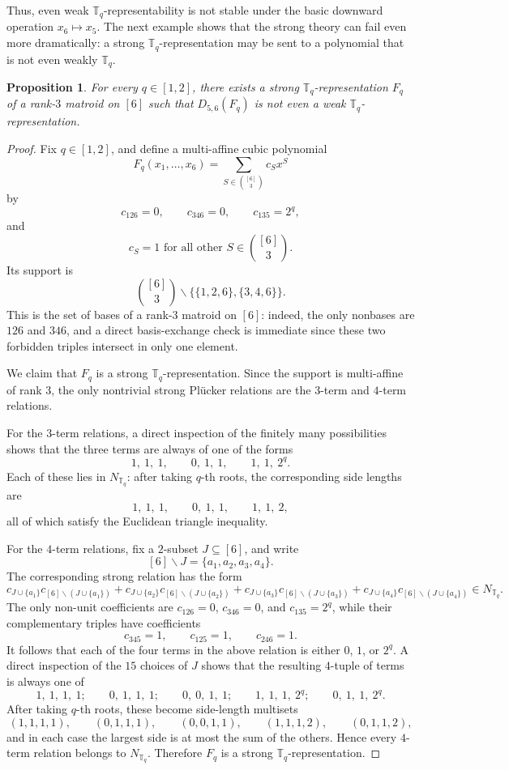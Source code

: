 \documentclass[12pt]{amsart}
\newtheorem{proposition}[theorem]{Proposition}
\theoremstyle{definition}
\newcommand{\1}{\mathbf{1}}
\newcommand\T{{\mathbb T}}
\renewcommand{\setminus}{\backslash}
\begin{document}
Thus, even weak $\T_q$-representability is not stable under the basic downward operation
$x_6\mapsto x_5$. The next example shows that the strong theory can fail even more
dramatically: a strong $\T_q$-representation may be sent to a polynomial that is not even
weakly $\T_q$.

\begin{proposition}
\label{prop:down-not-strong}
For every $q\in[1,2]$, there exists a strong $\T_q$-representation $F_q$ of a
rank-$3$ matroid on $[6]$ such that $D_{5,6}(F_q)$ is not even a weak
$\T_q$-representation.
\end{proposition}

\begin{proof}
Fix $q\in[1,2]$, and define a multi-affine cubic polynomial
\[
F_q(x_1,\dots,x_6)=\sum_{S\in \binom{[6]}{3}} c_S x^S
\]
by
\[
c_{126}=0,\qquad c_{346}=0,\qquad c_{135}=2^q,
\]
and
\[
c_S=1 \text{ for all other } S\in \binom{[6]}{3}.
\]
Its support is
\[
\binom{[6]}{3}\setminus\{\{1,2,6\},\{3,4,6\}\}.
\]
This is the set of bases of a rank-$3$ matroid on $[6]$: indeed, the only nonbases are
$126$ and $346$, and a direct basis-exchange check is immediate since these two forbidden
triples intersect in only one element.

We claim that $F_q$ is a strong $\T_q$-representation. Since the support is multi-affine of
rank $3$, the only nontrivial strong Pl\"ucker relations are the $3$-term and $4$-term
relations.

For the $3$-term relations, a direct inspection of the finitely many possibilities shows that
the three terms are always of one of the forms
\[
1,\ 1,\ 1,
\qquad
0,\ 1,\ 1,
\qquad
1,\ 1,\ 2^q.
\]
Each of these lies in $N_{\T_q}$: after taking $q$-th roots, the corresponding side lengths
are
\[
1,\ 1,\ 1,
\qquad
0,\ 1,\ 1,
\qquad
1,\ 1,\ 2,
\]
all of which satisfy the Euclidean triangle inequality.

For the $4$-term relations, fix a $2$-subset $J\subseteq [6]$, and write
\[
[6]\setminus J=\{a_1,a_2,a_3,a_4\}.
\]
The corresponding strong relation has the form
\[
c_{J\cup\{a_1\}}c_{[6]\setminus(J\cup\{a_1\})}
+
c_{J\cup\{a_2\}}c_{[6]\setminus(J\cup\{a_2\})}
+
c_{J\cup\{a_3\}}c_{[6]\setminus(J\cup\{a_3\})}
+
c_{J\cup\{a_4\}}c_{[6]\setminus(J\cup\{a_4\})}\in N_{\T_q}.
\]
The only non-unit coefficients are $c_{126}=0$, $c_{346}=0$, and $c_{135}=2^q$, while
their complementary triples have coefficients
\[
c_{345}=1,\qquad c_{125}=1,\qquad c_{246}=1.
\]
It follows that each of the four terms in the above relation is either $0$, $1$, or
$2^q$. A direct inspection of the $15$ choices of $J$ shows that the resulting $4$-tuple
of terms is always one of
\[
1,\ 1,\ 1,\ 1;
\qquad
0,\ 1,\ 1,\ 1;
\qquad
0,\ 0,\ 1,\ 1;
\qquad
1,\ 1,\ 1,\ 2^q;
\qquad
0,\ 1,\ 1,\ 2^q.
\]
After taking $q$-th roots, these become side-length multisets
\[
(1,1,1,1),\qquad (0,1,1,1),\qquad (0,0,1,1),\qquad (1,1,1,2),\qquad (0,1,1,2),
\]
and in each case the largest side is at most the sum of the others. Hence every
$4$-term relation belongs to $N_{\T_q}$. Therefore $F_q$ is a strong
$\T_q$-representation.


\end{proof}
\end{document}
